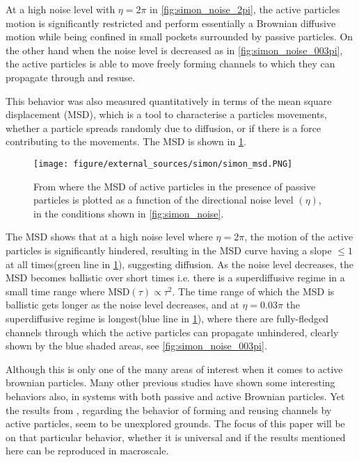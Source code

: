 At a high noise level with $\eta=2\pi$ in \cref{fig:simon_noise_2pi}, the active particles motion is significantly 
restricted and perform essentially a Brownian diffusive motion while being confined in small pockets surrounded by passive particles. 
On the other hand when the noise level is decreased as in \cref{fig:simon_noise_003pi}, the active particles is 
able to move freely forming channels to which they can propagate through and resuse.

This behavior was also measured quantitatively in terms of the mean square displacement (MSD), which 
is a tool to characterise a particles movements, whether a particle spreads randomly due to diffusion, or 
if there is a force contributing to the movements. The MSD is shown in \cref{fig:simon_msd}.

\begin{figure}[htp]
    \centering
    \texttt{[image: figure/external\_sources/simon/simon\_msd.PNG]}
    \caption{From \cite{nilsson2017metastable} where the MSD 
    of active particles in the presence of passive particles is plotted as a function of the directional
    noise level $(\eta)$, in the conditions shown in \cref{fig:simon_noise}.}
    \label{fig:simon_msd}
\end{figure}

The MSD shows that at a high noise level where $\eta=2\pi$, the motion of the active particles 
is significantly hindered, resulting in the MSD curve having a slope $\leq1$ at all times(green line in \cref{fig:simon_msd}), 
suggesting diffusion. As the noise level decreases, the MSD becomes ballistic over short times i.e. there 
is a superdiffusive regime in a small time range where $\text{MSD}(\tau)\propto\tau^2$. The time range of which the MSD is ballistic gets longer 
as the noise level decreases, and at $\eta=0.03\pi$ the superdiffusive regime is longest(blue line in \cref{fig:simon_msd}), where there are fully-fledged channels 
through which the active particles can propagate unhindered, clearly shown by the blue shaded areas, see \cref{fig:simon_noise_003pi}. 

Although this is only one of the many areas of interest when it comes to active brownian particles. Many other previous 
studies have shown some interesting behaviors also, in systems with both passive and active Brownian particles. %
Yet the results from \citeauthor{nilsson2017metastable}, regarding the behavior of forming and reusing channels by active particles, 
seem to be unexplored grounds. The focus of this paper will be on that particular behavior, whether it is universal and 
if the results mentioned here can be reproduced in macroscale.



